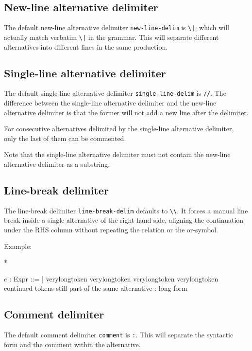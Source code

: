 \documentclass[11pt]{article}
\begin{document}
\subsection{New-line alternative delimiter}
The default new-line alternative delimiter \verb/new-line-delim/ is \verb/\|/, which will actually match verbatim \verb/\|/ in the grammar.
This will separate different alternatives into different lines in the same production.

\subsection{Single-line alternative delimiter}
The default single-line alternative delimiter \verb/single-line-delim/ is \verb|//|.
The difference between the single-line alternative delimiter and the new-line alternative delimiter is that the former will not add a new line after the delimiter.

For consecutive alternatives delimited by the single-line alternative delimiter, only the last of them can be commented.

Note that the single-line alternative delimiter must not contain the new-line alternative delimiter as a substring.

\subsection{Line-break delimiter}
The line-break delimiter \verb/line-break-delim/ defaults to \verb/\\/.
It forces a manual line break inside a single alternative of the right-hand side, aligning the continuation under the RHS column without repeating the relation or the or-symbol.

Example:
\begin{example}*
\begin{center}
\begin{bnf}
  $e$ : Expr ::=
  | verylongtoken verylongtoken verylongtoken verylongtoken \\
    continued tokens still part of the same alternative : long form
\end{bnf}
\end{center}
\end{example}

\subsection{Comment delimiter}
The default comment delimiter \verb/comment/ is \verb/:/.
This will separate the syntactic form and the comment within the alternative.
\end{document}
